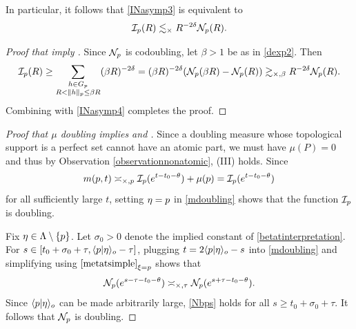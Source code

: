 In particular, it follows that \eqref{INasymp3} is equivalent to
\begin{equation}
\label{INasymp4}
\mathcal I_p(R) \lesssim_\times R^{-2\delta} \mathcal N_p(R).
\end{equation}
\begin{proof}[Proof that  imply ]
Since $\mathcal N_p$ is codoubling, let $\beta > 1$ be as in \eqref{dexp2}. Then
\[
\mathcal I_p(R) \geq \sum_{\substack{h\in G_p \\ R < \|h\|_p \leq \beta R}} (\beta R)^{-2\delta} = (\beta R)^{-2\delta} (\mathcal N_p(\beta R) - \mathcal N_p(R)) \gtrsim_{\times,\beta} R^{-2\delta} \mathcal N_p(R).
\]
Combining with \eqref{INasymp4} completes the proof.
\end{proof}
\begin{proof}[Proof that $\mu$ doubling implies  and ]
Since a doubling measure whose topological support is a perfect set cannot have an atomic part, we must have $\mu(P) = 0$ and thus by Observation \ref{observationnonatomic}, (III) holds. Since
\[
m(p,t) \asymp_{\times,p} \mathcal I_p(e^{t - t_0 - \theta}) + \mu(p) = \mathcal I_p(e^{t - t_0 - \theta})
\]
for all sufficiently large $t$, setting $\eta = p$ in \eqref{mdoubling} shows that the function $\mathcal I_p$ is doubling.

Fix $\eta\in\Lambda\setminus\{p\}$. Let $\sigma_0 > 0$ denote the implied constant of \eqref{betatinterpretation}. For $s\in [t_0 + \sigma_0 + \tau, \langle p|\eta\rangle_o - \tau]$, plugging $t = 2\langle p|\eta\rangle_o - s$ into \eqref{mdoubling} and simplifying using $\eqref{metatsimple}_{\xi = p}$ shows that
\begin{equation}
\label{Nbps}
\mathcal N_p(e^{s - \tau - t_0 - \theta}) \asymp_{\times,\tau} \mathcal N_p(e^{s + \tau - t_0 - \theta}).
\end{equation}
Since $\langle p|\eta\rangle_o$ can be made arbitrarily large, \eqref{Nbps} holds for all $s\geq t_0 + \sigma_0 + \tau$. It follows that $\mathcal N_p$ is doubling.


\end{proof}
